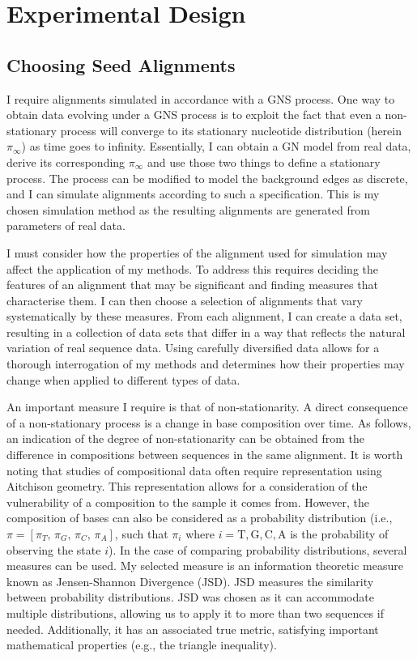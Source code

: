 \section{Experimental Design}

\subsection{Choosing Seed Alignments}
I require alignments simulated in accordance with a GNS process. One way to obtain data evolving under a GNS process is to exploit the fact that even a non-stationary process will converge to its stationary nucleotide distribution (herein $\pi_{\infty}$) as time goes to infinity. Essentially, I can obtain a GN model from real data, derive its corresponding $\pi_{\infty}$ and use those two things to define a stationary process. The process can be modified to model the background edges as discrete, and I can simulate alignments according to such a specification. This is my chosen simulation method as the resulting alignments are generated from parameters of real data. 

I must consider how the properties of the alignment used for simulation may affect the application of my methods. To address this requires deciding the features of an alignment that may be significant and finding measures that characterise them. I can then choose a selection of alignments that vary systematically by these measures. From each alignment, I can create a data set, resulting in a collection of data sets that differ in a way that reflects the natural variation of real sequence data. Using carefully diversified data allows for a thorough interrogation of my methods and determines how their properties may change when applied to different types of data.

An important measure I require is that of non-stationarity. A direct consequence of a non-stationary process is a change in base composition over time. As follows, an indication of the degree of non-stationarity can be obtained from the difference in compositions between sequences in the same alignment. It is worth noting that studies of compositional data often require representation using Aitchison geometry. This representation allows for a consideration of the vulnerability of a composition to the sample it comes from. However, the composition of bases can also be considered as a probability distribution (i.e., $\pi = [\pi_T,\, \pi_G, \, \pi_C, \, \pi_A]$, such that $\pi_i$ where $i= \mathrm{T}, \mathrm{G}, \mathrm{C}, \mathrm{A}$ is the probability of observing the state $i$). In the case of comparing probability distributions, several measures can be used. My selected measure is an information theoretic measure known as Jensen-Shannon Divergence (JSD). JSD measures the similarity between probability distributions. JSD was chosen as it can accommodate multiple distributions, allowing us to apply it to more than two sequences if needed. Additionally, it has an associated true metric, satisfying important mathematical properties (e.g., the triangle inequality). 

